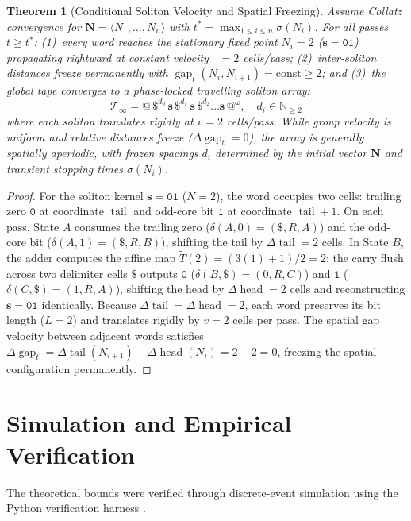 \documentclass[journal,10pt,twocolumn]{IEEEtran}
\newtheorem{theorem}{Theorem}
\DeclareMathOperator{\tail}{tail}
\DeclareMathOperator{\head}{head}
\DeclareMathOperator{\gap}{gap}
\DeclareMathOperator{\vsoliton}{v_{\text{soliton}}}
\begin{document}
\begin{theorem}[Conditional Soliton Velocity and Spatial Freezing]
Assume Collatz convergence for $\mathbf{N} = \langle N_1, \dots, N_n \rangle$ with $t^* = \max_{1 \le i \le n} \sigma(N_i)$. For all passes $t \ge t^*$: (1)~every word reaches the stationary fixed point $N_i = 2$ ($\mathbf{s} = \texttt{01}$) propagating rightward at constant velocity $\vsoliton = 2$ cells/pass; (2)~inter-soliton distances freeze permanently with $\gap_t(N_i, N_{i+1}) = \text{const} \ge 2$; and (3)~the global tape converges to a phase-locked travelling soliton array:
\begin{equation}
\mathcal{T}_\infty = @ \, \$^{d_0} \, \mathbf{s} \, \$^{d_1} \, \mathbf{s} \, \$^{d_2} \dots \mathbf{s} \, @^\omega, \quad d_i \in \mathbb{N}_{\ge 2}
\label{eq:soliton_array}
\end{equation}
where each soliton translates rigidly at $v = 2$ cells/pass. While group velocity is uniform and relative distances freeze ($\Delta \gap_t = 0$), the array is generally spatially aperiodic, with frozen spacings $d_i$ determined by the initial vector $\mathbf{N}$ and transient stopping times $\sigma(N_i)$.
\end{theorem}
\begin{proof}
For the soliton kernel $\mathbf{s} = \texttt{01}$ ($N=2$), the word occupies two cells: trailing zero $\texttt{0}$ at coordinate $\tail$ and odd-core bit $\texttt{1}$ at coordinate $\tail+1$. On each pass, State $A$ consumes the trailing zero ($\delta(A, 0) = (\$, R, A)$) and the odd-core bit ($\delta(A, 1) = (\$, R, B)$), shifting the tail by $\Delta\tail = 2$ cells. In State $B$, the adder computes the affine map $\widetilde{T}(2) = (3(1)+1)/2 = 2$: the carry flush across two delimiter cells $\$$ outputs $\texttt{0}$ ($\delta(B, \$) = (0, R, C)$) and $\texttt{1}$ ($\delta(C, \$) = (1, R, A)$), shifting the head by $\Delta\head = 2$ cells and reconstructing $\mathbf{s} = \texttt{01}$ identically. Because $\Delta\tail = \Delta\head = 2$, each word preserves its bit length ($L = 2$) and translates rigidly by $v = 2$ cells per pass. The spatial gap velocity between adjacent words satisfies $\Delta\gap_t = \Delta\tail(N_{i+1}) - \Delta\head(N_i) = 2 - 2 = 0$, freezing the spatial configuration permanently.
\end{proof}

\section{Simulation and Empirical Verification}
The theoretical bounds were verified through discrete-event simulation using the Python verification harness \cite{varshney2026notes}.
\end{document}
